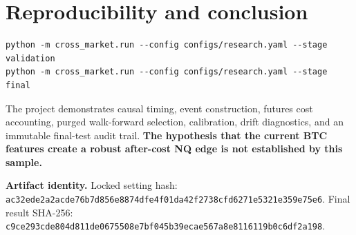 \documentclass[10pt]{article}
\newcommand{\result}[1]{\textbf{\color{navy}#1}}
\begin{document}
\section{Reproducibility and conclusion}
\begin{verbatim}
python -m cross_market.run --config configs/research.yaml --stage validation
python -m cross_market.run --config configs/research.yaml --stage final
\end{verbatim}
The project demonstrates causal timing, event construction, futures cost accounting, purged walk-forward selection, calibration, drift diagnostics, and an immutable final-test audit trail. \result{The hypothesis that the current BTC features create a robust after-cost NQ edge is not established by this sample.}

\vfill
\footnotesize\color{slate}\textbf{Artifact identity.} Locked setting hash: \texttt{ac32ede2a2acde76b7d856e8874dfe4f01da42f2738cfd6271e5321e359e75e6}. Final result SHA-256: \texttt{c9ce293cde804d811de0675508e7bf045b39ecae567a8e8116119b0c6df2a198}.
\end{document}
